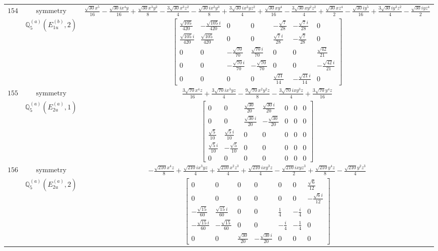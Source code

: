 \documentclass[fleqn,8pt,landscape]{jsarticle}
\begin{document}
\begin{longtable}{ccc}
$ 154 $ & $ \text{symmetry} $ & $ \frac{\sqrt{30} x^{5}}{16} - \frac{\sqrt{30} i x^{4} y}{16} + \frac{\sqrt{30} x^{3} y^{2}}{8} - \frac{3 \sqrt{30} x^{3} z^{2}}{4} - \frac{\sqrt{30} i x^{2} y^{3}}{8} + \frac{3 \sqrt{30} i x^{2} y z^{2}}{4} + \frac{\sqrt{30} x y^{4}}{16} - \frac{3 \sqrt{30} x y^{2} z^{2}}{4} + \frac{\sqrt{30} x z^{4}}{2} - \frac{\sqrt{30} i y^{5}}{16} + \frac{3 \sqrt{30} i y^{3} z^{2}}{4} - \frac{\sqrt{30} i y z^{4}}{2} $ \\
$  $ & $ \mathbb{Q}_{5}^{(a)}(E_{1u}^{(b)},2) $ & $ \begin{bmatrix} \frac{\sqrt{105}}{420} & - \frac{\sqrt{105} i}{420} & 0 & 0 & - \frac{\sqrt{7}}{28} & - \frac{\sqrt{7} i}{28} & 0 \\ \frac{\sqrt{105} i}{420} & \frac{\sqrt{105}}{420} & 0 & 0 & \frac{\sqrt{7} i}{28} & - \frac{\sqrt{7}}{28} & 0 \\ 0 & 0 & - \frac{\sqrt{70}}{70} & \frac{\sqrt{70} i}{70} & 0 & 0 & \frac{\sqrt{42}}{21} \\ 0 & 0 & - \frac{\sqrt{70} i}{70} & - \frac{\sqrt{70}}{70} & 0 & 0 & - \frac{\sqrt{42} i}{21} \\ 0 & 0 & 0 & 0 & \frac{\sqrt{21}}{14} & - \frac{\sqrt{21} i}{14} & 0 \end{bmatrix} $ \\ \hline
$ 155 $ & $ \text{symmetry} $ & $ \frac{3 \sqrt{70} x^{4} z}{16} + \frac{3 \sqrt{70} i x^{3} y z}{4} - \frac{9 \sqrt{70} x^{2} y^{2} z}{8} - \frac{3 \sqrt{70} i x y^{3} z}{4} + \frac{3 \sqrt{70} y^{4} z}{16} $ \\
$  $ & $ \mathbb{Q}_{5}^{(a)}(E_{2u}^{(a)},1) $ & $ \begin{bmatrix} 0 & 0 & \frac{\sqrt{30}}{20} & \frac{\sqrt{30} i}{20} & 0 & 0 & 0 \\ 0 & 0 & \frac{\sqrt{30} i}{20} & - \frac{\sqrt{30}}{20} & 0 & 0 & 0 \\ \frac{\sqrt{5}}{10} & \frac{\sqrt{5} i}{10} & 0 & 0 & 0 & 0 & 0 \\ \frac{\sqrt{5} i}{10} & - \frac{\sqrt{5}}{10} & 0 & 0 & 0 & 0 & 0 \\ 0 & 0 & 0 & 0 & 0 & 0 & 0 \end{bmatrix} $ \\ \hline
$ 156 $ & $ \text{symmetry} $ & $ - \frac{\sqrt{210} x^{4} z}{8} + \frac{\sqrt{210} i x^{3} y z}{4} + \frac{\sqrt{210} x^{2} z^{3}}{4} + \frac{\sqrt{210} i x y^{3} z}{4} - \frac{\sqrt{210} i x y z^{3}}{2} + \frac{\sqrt{210} y^{4} z}{8} - \frac{\sqrt{210} y^{2} z^{3}}{4} $ \\
$  $ & $ \mathbb{Q}_{5}^{(a)}(E_{2u}^{(a)},2) $ & $ \begin{bmatrix} 0 & 0 & 0 & 0 & 0 & 0 & \frac{\sqrt{6}}{12} \\ 0 & 0 & 0 & 0 & 0 & 0 & - \frac{\sqrt{6} i}{12} \\ - \frac{\sqrt{15}}{60} & \frac{\sqrt{15} i}{60} & 0 & 0 & \frac{1}{4} & - \frac{i}{4} & 0 \\ - \frac{\sqrt{15} i}{60} & - \frac{\sqrt{15}}{60} & 0 & 0 & - \frac{i}{4} & - \frac{1}{4} & 0 \\ 0 & 0 & \frac{\sqrt{30}}{20} & - \frac{\sqrt{30} i}{20} & 0 & 0 & 0 \end{bmatrix} $ \\ \hline

\end{longtable}
\end{document}
